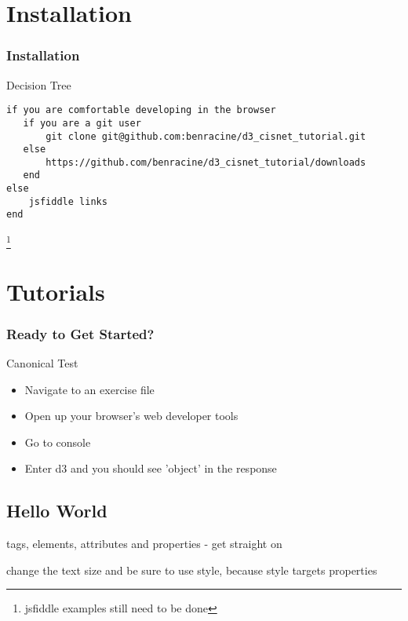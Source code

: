 \documentclass{beamer}
\begin{document}
\section{Installation}

\begin{frame}[fragile]
    \frametitle{Installation}
    \begin{block}{Decision Tree}
        \tiny{
        \begin{verbatim}
if you are comfortable developing in the browser
   if you are a git user
       git clone git@github.com:benracine/d3_cisnet_tutorial.git
   else
       https://github.com/benracine/d3_cisnet_tutorial/downloads
   end
else
    jsfiddle links
end
        \end{verbatim}
        }
    \end{block}
    \footnote{jsfiddle examples still need to be done}
\end{frame}


\section{Tutorials}


\begin{frame}
    \frametitle{Ready to Get Started?}
    \begin{block}{Canonical Test}
        \begin{itemize}
        \pause
        \item Navigate to an exercise file
        \pause
        \item Open up your browser's web developer tools
        \pause
        \item Go to console
        \pause
        \item Enter d3 and you should see 'object' in the response
        \end{itemize}
    \end{block}
\end{frame}


\subsection{Hello World}

\html tags, elements, attributes and properties 
- get straight on 

change the text size and be sure to use style, because
style targets properties
\end{document}
